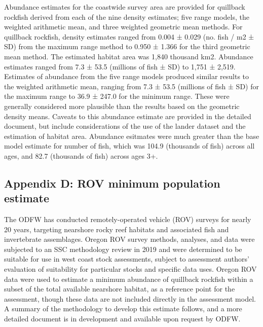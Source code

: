 \documentclass[11pt,
  english,
  a4paper,
]{article}
\begin{document}
\leavevmode\tagmcend\tagstructend\par


Abundance estimates for the coastwide survey area are provided for quillback rockfish derived from each of the nine density estimates; five range models, the weighted arithmetic mean, and three weighted geometric mean methods. For quillback rockfish, density estimates ranged from 0.004 ± 0.029 (no. fish / m2 ± SD) from the maximum range method to 0.950 ± 1.366 for the third geometric mean method. The estimated habitat area was 1,840 thousand km2. Abundance estimates ranged from 7.3 ± 53.5 (millions of fish ± SD) to 1,751 ± 2,519. Estimates of abundance from the five range models produced similar results to the weighted arithmetic mean, ranging from 7.3 ± 53.5 (millions of fish ± SD) for the maximum range to 36.9 ± 247.0 for the minimum range. These were generally considered more plausible than the results based on the geometric density means. Caveats to this abundance estimate are provided in the detailed document, but include considerations of the use of the lander dataset and the estimation of habitat area. Abundance esitmates were much greater than the base model estimate for number of fish, which was 104.9 (thousands of fish) across all ages, and 82.7 (thousands of fish) across ages 3+.

\leavevmode\tagmcend\tagstructend\par


\hypertarget{appendix-d-rov-minimum-population-estimate}{%
\subsection{Appendix D: ROV minimum population estimate}\label{appendix-d-rov-minimum-population-estimate}}

\leavevmode\tagmcend\tagstructend


The ODFW has conducted remotely-operated vehicle (ROV) surveys for nearly 20 years, targeting nearshore rocky reef habitats and associated fish and invertebrate assemblages. Oregon ROV survey methods, analyses, and data were subjected to an SSC methodology review in 2019 and were determined to be suitable for use in west coast stock assessments, subject to assessment authors' evaluation of suitability for particular stocks and specific data uses. Oregon ROV data were used to estimate a minimum abundance of quillback rockfish within a subset of the total available nearshore habitat, as a reference point for the assessment, though these data are not included directly in the assessment model. A summary of the methodology to develop this estimate follows, and a more detailed document is in development and available upon request by ODFW.
\end{document}
